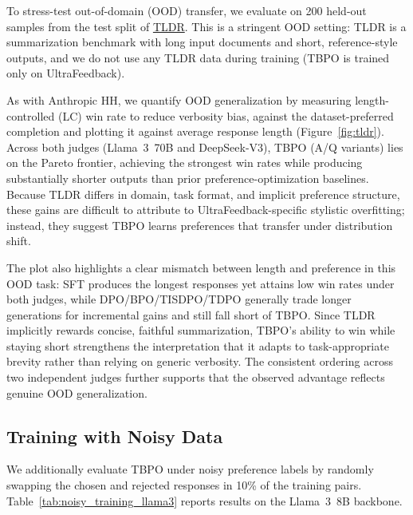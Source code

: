 \documentclass{article}
\theoremstyle{plain}
\theoremstyle{definition}
\theoremstyle{remark}
\begin{document}
To stress-test out-of-domain (OOD) transfer, we evaluate on 200 held-out samples from the test split of \href{https://huggingface.co/datasets/trl-lib/tldr}{TLDR}. This is a stringent OOD setting: TLDR is a summarization benchmark with long input documents and short, reference-style outputs, and we do not use any TLDR data during training (TBPO is trained only on UltraFeedback).

As with Anthropic HH, we quantify OOD generalization by measuring length-controlled (LC) win rate to reduce verbosity bias, against the dataset-preferred completion and plotting it against average response length (Figure~\ref{fig:tldr}). Across both judges (Llama~3~70B and DeepSeek-V3), TBPO (A/Q variants) lies on the Pareto frontier, achieving the strongest win rates while producing substantially shorter outputs than prior preference-optimization baselines. Because TLDR differs in domain, task format, and implicit preference structure, these gains are difficult to attribute to UltraFeedback-specific stylistic overfitting; instead, they suggest TBPO learns preferences that transfer under distribution shift.

The plot also highlights a clear mismatch between length and preference in this OOD task: SFT produces the longest responses yet attains low win rates under both judges, while DPO/BPO/TISDPO/TDPO generally trade longer generations for incremental gains and still fall short of TBPO. Since TLDR implicitly rewards concise, faithful summarization, TBPO’s ability to win while staying short strengthens the interpretation that it adapts to task-appropriate brevity rather than relying on generic verbosity. The consistent ordering across two independent judges further supports that the observed advantage reflects genuine OOD generalization.

\subsection{Training with Noisy Data}

We additionally evaluate TBPO under noisy preference labels by randomly swapping the chosen and rejected responses in 10\% of the training pairs. Table~\ref{tab:noisy_training_llama3} reports results on the Llama~3~8B backbone.
\end{document}

